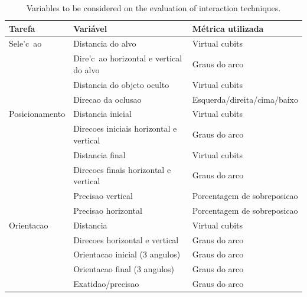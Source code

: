 \begin{table}[h!]
	\caption{Variables to be considered on the evaluation of
		interaction techniques.}
	\label{tabone}
	\begin{footnotesize}
	\begin{tabular}{|p{40mm}|p{55mm}|p{42mm}|}
	\hline
	\hspace*{\fill}\textbf{Tarefa}\hspace*{\fill} &
	\hspace*{\fill}\textbf{Variável}\hspace*{\fill} & 
	\hspace*{\fill}\textbf{Métrica utilizada}\hspace*{\fill}\\
	\hline
	Sele{'c}{~a}o &
	Distancia do alvo &
	Virtual cubits \\ \cline{2-3}
	& Dire{'c}{~a}o horizontal e vertical do alvo &
	Graus do arco \\ \cline{2-3}
	& Distancia do objeto oculto &
	Virtual cubits \\ \cline{2-3}
	& Direcao da oclusao &
	Esquerda/direita/cima/baixo \\
	\hline
	Posicionamento &
	Distancia inicial &
	Virtual cubits \\ \cline{2-3}
	& Direcoes iniciais horizontal e vertical &
	Graus do arco \\ \cline{2-3}
	& Distancia final &
	Virtual cubits \\ \cline{2-3}
	& Direcoes finais horizontal e vertical &
	Graus do arco \\ \cline{2-3}
	& Precisao vertical &
	Porcentagem de sobreposicao \\ \cline{2-3}
	& Precisao horizontal &
	Porcentagem de sobreposicao \\
	\hline
	Orientacao &
	Distancia &
	Virtual cubits \\ \cline{2-3}
	& Direcoes horizontal e vertical &
	Graus do arco \\ \cline{2-3}
	& Orientacao inicial (3 angulos) &
	Graus do arco \\ \cline{2-3}
	& Orientacao final (3 angulos) &
	Graus do arco \\ \cline{2-3}
	& Exatidao/precisao &
	Graus do arco \\
	\hline
	\end{tabular}
	\end{footnotesize}
\end{table}

